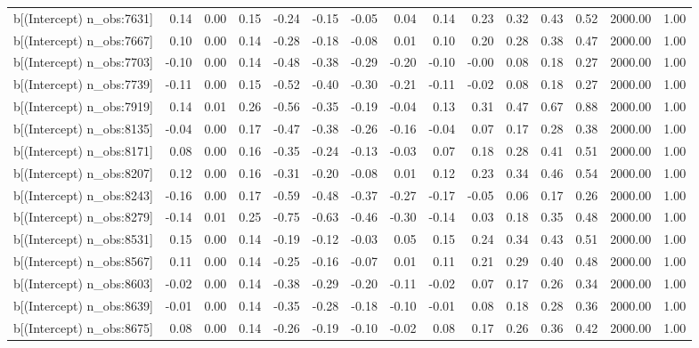 \begin{table}[ht]
\begin{tabular}{rrrrrrrrrrrrrrr}
  b[(Intercept) n\_obs:7631] & 0.14 & 0.00 & 0.15 & -0.24 & -0.15 & -0.05 & 0.04 & 0.14 & 0.23 & 0.32 & 0.43 & 0.52 & 2000.00 & 1.00 \\ 
  b[(Intercept) n\_obs:7667] & 0.10 & 0.00 & 0.14 & -0.28 & -0.18 & -0.08 & 0.01 & 0.10 & 0.20 & 0.28 & 0.38 & 0.47 & 2000.00 & 1.00 \\ 
  b[(Intercept) n\_obs:7703] & -0.10 & 0.00 & 0.14 & -0.48 & -0.38 & -0.29 & -0.20 & -0.10 & -0.00 & 0.08 & 0.18 & 0.27 & 2000.00 & 1.00 \\ 
  b[(Intercept) n\_obs:7739] & -0.11 & 0.00 & 0.15 & -0.52 & -0.40 & -0.30 & -0.21 & -0.11 & -0.02 & 0.08 & 0.18 & 0.27 & 2000.00 & 1.00 \\ 
  b[(Intercept) n\_obs:7919] & 0.14 & 0.01 & 0.26 & -0.56 & -0.35 & -0.19 & -0.04 & 0.13 & 0.31 & 0.47 & 0.67 & 0.88 & 2000.00 & 1.00 \\ 
  b[(Intercept) n\_obs:8135] & -0.04 & 0.00 & 0.17 & -0.47 & -0.38 & -0.26 & -0.16 & -0.04 & 0.07 & 0.17 & 0.28 & 0.38 & 2000.00 & 1.00 \\ 
  b[(Intercept) n\_obs:8171] & 0.08 & 0.00 & 0.16 & -0.35 & -0.24 & -0.13 & -0.03 & 0.07 & 0.18 & 0.28 & 0.41 & 0.51 & 2000.00 & 1.00 \\ 
  b[(Intercept) n\_obs:8207] & 0.12 & 0.00 & 0.16 & -0.31 & -0.20 & -0.08 & 0.01 & 0.12 & 0.23 & 0.34 & 0.46 & 0.54 & 2000.00 & 1.00 \\ 
  b[(Intercept) n\_obs:8243] & -0.16 & 0.00 & 0.17 & -0.59 & -0.48 & -0.37 & -0.27 & -0.17 & -0.05 & 0.06 & 0.17 & 0.26 & 2000.00 & 1.00 \\ 
  b[(Intercept) n\_obs:8279] & -0.14 & 0.01 & 0.25 & -0.75 & -0.63 & -0.46 & -0.30 & -0.14 & 0.03 & 0.18 & 0.35 & 0.48 & 2000.00 & 1.00 \\ 
  b[(Intercept) n\_obs:8531] & 0.15 & 0.00 & 0.14 & -0.19 & -0.12 & -0.03 & 0.05 & 0.15 & 0.24 & 0.34 & 0.43 & 0.51 & 2000.00 & 1.00 \\ 
  b[(Intercept) n\_obs:8567] & 0.11 & 0.00 & 0.14 & -0.25 & -0.16 & -0.07 & 0.01 & 0.11 & 0.21 & 0.29 & 0.40 & 0.48 & 2000.00 & 1.00 \\ 
  b[(Intercept) n\_obs:8603] & -0.02 & 0.00 & 0.14 & -0.38 & -0.29 & -0.20 & -0.11 & -0.02 & 0.07 & 0.17 & 0.26 & 0.34 & 2000.00 & 1.00 \\ 
  b[(Intercept) n\_obs:8639] & -0.01 & 0.00 & 0.14 & -0.35 & -0.28 & -0.18 & -0.10 & -0.01 & 0.08 & 0.18 & 0.28 & 0.36 & 2000.00 & 1.00 \\ 
  b[(Intercept) n\_obs:8675] & 0.08 & 0.00 & 0.14 & -0.26 & -0.19 & -0.10 & -0.02 & 0.08 & 0.17 & 0.26 & 0.36 & 0.42 & 2000.00 & 1.00 \\ 

\end{tabular}
\end{table}
